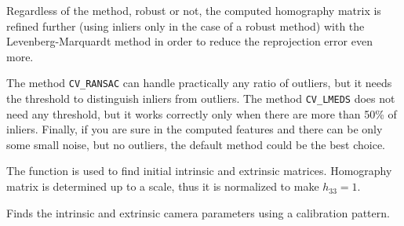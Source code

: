 Regardless of the method, robust or not, the computed homography
matrix is refined further (using inliers only in the case of a robust
method) with the Levenberg-Marquardt method in order to reduce the
reprojection error even more.

The method \texttt{CV\_RANSAC} can handle practically any ratio of outliers,
but it needs the threshold to distinguish inliers from outliers.
The method \texttt{CV\_LMEDS} does not need any threshold, but it works
correctly only when there are more than 50\% of inliers. Finally,
if you are sure in the computed features and there can be only some
small noise, but no outliers, the default method could be the best
choice.

The function is used to find initial intrinsic and extrinsic matrices.
Homography matrix is determined up to a scale, thus it is normalized
to make $h_{33} =1$.

\label{CalibrateCamera2}

Finds the intrinsic and extrinsic camera parameters using a calibration pattern.


